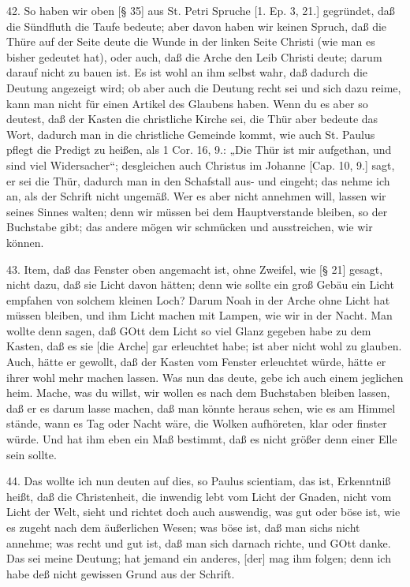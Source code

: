 42. So haben wir oben [§ 35] aus St. Petri Spruche [1. Ep. 3, 21.] gegründet, daß die Sündfluth die Taufe bedeute; aber davon haben wir keinen Spruch, daß die Thüre auf der Seite deute die Wunde in der linken Seite Christi (wie man es bisher gedeutet hat), oder auch, daß die Arche den Leib Christi deute; darum darauf nicht zu bauen ist. Es ist wohl an ihm selbst wahr, daß dadurch die Deutung angezeigt wird; ob aber auch die Deutung recht sei und sich dazu reime, kann man nicht für einen Artikel des Glaubens haben. Wenn du es aber so deutest, daß der Kasten die christliche Kirche sei, die Thür aber bedeute das Wort, dadurch man in die christliche Gemeinde kommt, wie auch St. Paulus pflegt die Predigt zu heißen, als 1 Cor. 16, 9.: „Die Thür ist mir aufgethan, und sind viel Widersacher“; desgleichen auch Christus im Johanne [Cap. 10, 9.] sagt, er sei die Thür, dadurch man in den Schafstall aus- und eingeht; das nehme ich an, als der Schrift nicht ungemäß. Wer es aber nicht annehmen will, lassen wir seines Sinnes walten; denn wir müssen bei dem Hauptverstande bleiben, so der Buchstabe gibt; das andere mögen wir schmücken und ausstreichen, wie wir können.

43. Item, daß das Fenster oben angemacht ist, ohne Zweifel, wie [§ 21] gesagt, nicht dazu, daß sie Licht davon hätten; denn wie sollte ein groß Gebäu ein Licht empfahen von solchem kleinen Loch? Darum Noah in der Arche ohne Licht hat müssen bleiben, und ihm Licht machen mit Lampen, wie wir in der Nacht. Man wollte denn sagen, daß GOtt dem Licht so viel Glanz gegeben habe zu dem Kasten, daß es sie [die Arche] gar erleuchtet habe; ist aber nicht wohl zu glauben. Auch, hätte er gewollt, daß der Kasten vom Fenster erleuchtet würde, hätte er ihrer wohl mehr machen lassen. Was nun das deute, gebe ich auch einem jeglichen heim. Mache, was du willst, wir wollen es nach dem Buchstaben bleiben lassen, daß er es darum lasse machen, daß man könnte heraus sehen, wie es am Himmel stände, wann es Tag oder Nacht wäre, die Wolken aufhöreten, klar oder finster würde. Und hat ihm eben ein Maß bestimmt, daß es nicht größer denn einer Elle sein sollte.

44. Das wollte ich nun deuten auf dies, so Paulus scientiam, das ist, Erkenntniß heißt, daß die Christenheit, die inwendig lebt vom Licht der Gnaden, nicht vom Licht der Welt, sieht und richtet doch auch auswendig, was gut oder böse ist, wie es zugeht nach dem äußerlichen Wesen; was böse ist, daß man sichs nicht annehme; was recht und gut ist, daß man sich darnach richte, und GOtt danke. Das sei meine Deutung; hat jemand ein anderes, [der] mag ihm folgen; denn ich habe deß nicht gewissen Grund aus der Schrift.

